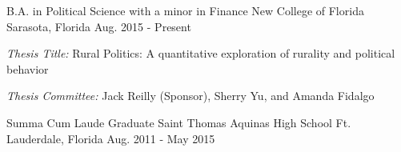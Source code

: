 

\begin{cventries}

  \cventry
    {B.A. in Political Science with a minor in Finance} %
    {New College of Florida} %
    {Sarasota, Florida} %
    {Aug. 2015 - Present} %
    {
    \begin{cvitems}
      \item \emph{Thesis Title:} Rural Politics: A quantitative exploration of rurality and political behavior
      \item \emph{Thesis Committee:} Jack Reilly (Sponsor), Sherry Yu, and Amanda Fidalgo
    \end{cvitems}
  }

  \cventry
    {Summa Cum Laude Graduate} %
    {Saint Thomas Aquinas High School} %
    {Ft. Lauderdale, Florida} %
    {Aug. 2011 - May 2015} %
    {}


\vspace{-.1cm}


\end{cventries}
